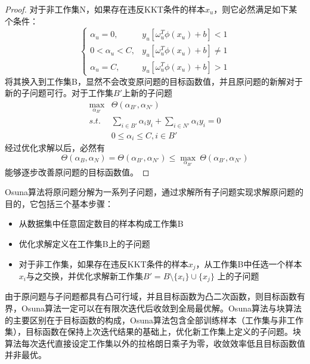 \begin{proof}
对于非工作集N，如果存在违反KKT条件的样本$x_u$，则它必然满足如下某个条件：
  \begin{equation}
    \left\{
    \begin{array}{ll}
        \alpha_u=0, & y_u [\omega_u^T \phi(x_u) + b] < 1\\
        0<\alpha_u<C, & y_u [\omega_u^T \phi(x_u) + b] \ne 1\\
        \alpha_u=C, & y_u [\omega_u^T \phi(x_u) + b] > 1
    \end{array}
    \right.
  \end{equation}
将其换入到工作集B，显然不会改变原问题的目标函数值，并且原问题的新解对于新的子问题可行。对于工作集$B'$上新的子问题
  \begin{equation}
    \begin{array}{ll}
      \max\limits_{\alpha_{B'}} & \Theta(\alpha_{B'},\alpha_{N'})\\
      \textit{s.t.} & \sum\limits_{i\in B'} \alpha_i y_i + \sum\limits_{i\in N'} \alpha_i y_i = 0 \\
      & 0\le \alpha_i \le C ,i\in B'
    \end{array}
  \end{equation}
经过优化求解以后，必然有
\begin{equation}
    \Theta(\alpha_B,\alpha_N) = \Theta(\alpha_{B'},\alpha_{N'}) \le \max\limits_{\alpha_{B'}}~\Theta(\alpha_{B'},\alpha_{N'})
\end{equation}
能够逐步改善原问题的目标函数值。
\end{proof}

Osuna算法将原问题分解为一系列子问题，通过求解所有子问题实现求解原问题的目的，它包括三个基本步骤：
\begin{itemize}
  \item 从数据集中任意固定数目的样本构成工作集B
  \item 优化求解定义在工作集B上的子问题
  \item 对于非工作集，如果存在违反KKT条件的样本$x_j$，从工作集B中任选一个样本$x_i$与之交换，并优化求解新工作集$B'=B\setminus\{x_i\}\cup\{x_j\}$ 上的子问题
\end{itemize}

由于原问题与子问题都具有凸可行域，并且目标函数为凸二次函数，则目标函数有界，Osuna算法一定可以在有限次迭代后收敛到全局最优解。Osuna算法与块算法的主要区别在于目标函数的构成，Osuna算法包含全部训练样本（工作集与非工作集），目标函数在保持上次迭代结果的基础上，优化新工作集上定义的子问题。块算法每次迭代直接设定工作集以外的拉格朗日乘子为零，收敛效率低且目标函数值并非最优。

